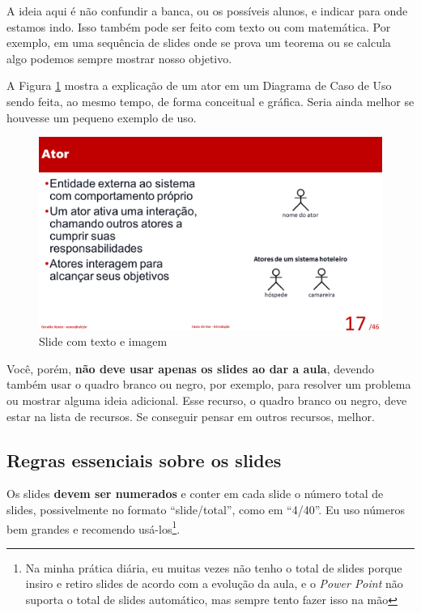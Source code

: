 \documentclass[12pt]{article}
\def\tam{0.5}
\begin{document}
A ideia aqui é não confundir a banca, ou os possíveis alunos, e indicar para onde estamos indo. Isso também pode ser feito com texto ou com matemática.
Por exemplo, em uma sequência de slides onde se prova um teorema ou se calcula algo podemos sempre mostrar nosso objetivo.

A Figura \ref{fig:teximag} mostra a explicação de um ator em um Diagrama de Caso de Uso sendo feita, ao mesmo tempo, de forma conceitual e gráfica. Seria ainda melhor se houvesse um pequeno exemplo de uso.

\begin{figure}[hbt]
    \centering
    \includegraphics[width=\tam\linewidth]{imagens/slidecomimage.png}
    \caption{Slide com texto e imagem}
    \label{fig:teximag}
\end{figure}

Você, porém, \textbf{não deve usar apenas os slides ao dar a aula}, devendo também usar o quadro branco ou negro, por exemplo, para resolver um problema ou mostrar alguma ideia adicional. Esse recurso, o quadro branco ou negro, deve estar na lista de recursos. Se conseguir pensar em outros recursos, melhor.


\subsection{Regras essenciais sobre os slides}

Os slides \textbf{devem ser numerados} e conter em cada slide o número total de slides, possivelmente no formato ``slide/total'', como em ``4/40''.
Eu uso números bem grandes e recomendo usá-los\footnote{Na minha prática diária, eu muitas vezes não tenho o total de slides porque insiro e retiro slides de acordo com a evolução da aula, e o \textit{Power Point} não suporta o  total de slides automático, mas sempre tento fazer isso na mão}.
\end{document}

